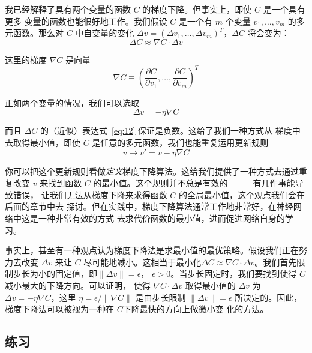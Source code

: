 我已经解释了具有两个变量的函数 $C$ 的梯度下降。但事实上，即使 $C$ 是一个具有更多
变量的函数也能很好地工作。我们假设 $C$ 是一个有 $m$ 个变量 $v_1,\ldots,v_m$ 的多
元函数。那么对 $C$ 中自变量的变化 $\Delta v = (\Delta v_1, \ldots, \Delta
v_m)^T$，$\Delta C$ 将会变为：
\begin{equation}
  \Delta C \approx \nabla C \cdot \Delta v
  \label{eq:12}\tag{12}
\end{equation}

这里的梯度 $\nabla C$ 是向量
\begin{equation}
  \nabla C \equiv \left(\frac{\partial C}{\partial v_1}, \ldots,
    \frac{\partial C}{\partial v_m}\right)^T
  \label{eq:13}\tag{13}
\end{equation}

正如两个变量的情况，我们可以选取
\begin{equation}
  \Delta v = -\eta \nabla C
  \label{eq:14}\tag{14}
\end{equation}

而且 $\Delta C$ 的（近似）表达式~\eqref{eq:12} 保证是负数。这给了我们一种方式从
梯度中去取得最小值，即使 $C$ 是任意的多元函数，我们也能重复运用更新规则
\begin{equation}
  v \rightarrow v' = v-\eta \nabla C
  \label{eq:15}\tag{15}
\end{equation}

你可以把这个更新规则看做\emph{定义}梯度下降算法。这给我们提供了一种方式去通过重
复改变 $v$ 来找到函数 $C$ 的最小值。这个规则并不总是有效的~——~有几件事能导致错误，
让我们无法从梯度下降来求得函数 $C$ 的全局最小值，这个观点我们会在后面的章节中去
探讨。但在实践中，梯度下降算法通常工作地非常好，在神经网络中这是一种非常有效的方式
去求代价函数的最小值，进而促进网络自身的学习。

事实上，甚至有一种观点认为梯度下降法是求最小值的最优策略。假设我们正在努力去改变
$\Delta v$ 来让 $C$ 尽可能地减小。这相当于最小化$\Delta C \approx \nabla C \cdot
\Delta v$。我们首先限制步长为小的固定值，即$\| \Delta v \| = \epsilon$，
$\epsilon > 0$。当步长固定时，我们要找到使得 $C$ 减小最大的下降方向。可以证明，
使得 $\nabla C \cdot \Delta v$ 取得最小值的 $\Delta v$ 为 $\Delta v = - \eta
\nabla C$，这里 $\eta = \epsilon / \|\nabla C\|$ 是由步长限制 $\|\Delta v\| =
\epsilon$ 所决定的。因此，梯度下降法可以被视为一种在 $C$下降最快的方向上做微小变
化的方法。

\subsection*{练习}

